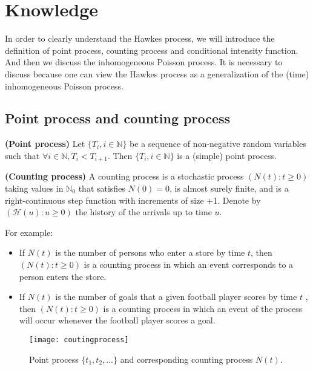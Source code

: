 \chapter{Knowledge}
\label{chapter:knowledge}
In order to clearly understand the Hawkes process, we will introduce the definition of point process, counting process and conditional intensity function. And then we discuss the  inhomogeneous Poisson process. It is necessary to discuss because one can view the Hawkes process as a generalization of the (time) inhomogeneous Poisson process.
\section{Point process and counting process}
\begin{definition}
	\cite{hawkes} \textbf{(Point process)} Let $\{T_i, i \in \mathbb{N} \}$ be a sequence of non-negative random variables such that $\forall i \in \mathbb{N}, T_i<T_{i+1}$. Then $\{T_i, i \in \mathbb{N} \}$ is a (simple) point process.
\end{definition}
\begin{definition}
	\cite{hawkes} \textbf{(Counting process)} A counting process is a stochastic process $(N(t):t \geq 0)$ taking values in $\mathbb{N}_0$ that satisfies $N(0)=0$, is almost surely finite, and is a right-continuous step function with increments of size +1. Denote by $(\mathcal{H}(u): u \geq 0)$ the history of the arrivals up to time $u$.
\end{definition}
\noindent
For example:
\begin{itemize}
	\item If $N(t)$ is the number of persons who enter a store by time $t$, then $(N(t):t \geq 0)$ is a counting process in which an event corresponds to a person enters the store.
	\item If $N(t)$ is the number of goals that a given football player scores by time $t$ , then $(N(t):t \geq 0)$ is a counting process in which an event of the process will occur whenever the football player scores a goal.
\end{itemize}
\begin{figure}[H]
	\centering
	\texttt{[image: coutingprocess]}
	\caption[Point process $\{t_1, t_2,...\}$ and corresponding counting process $N(t)$.]{Point process $\{t_1, t_2,...\}$ and corresponding counting process $N(t)$.}
\end{figure}
